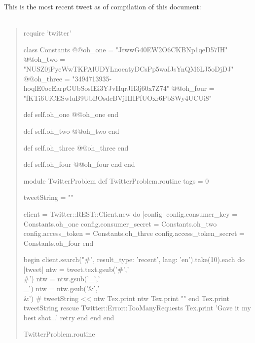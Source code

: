 \documentclass{article}
\begin{document}
This is the most recent tweet as of compilation of this document:\\\\
\begin{quote}
\begin{rbtex}
    require 'twitter'

    class Constants
    	@@oh_one = "JtwwG40EW2O6CKBNp1qeD57IH"
    	@@oh_two = "NUSZ0jPyeWwTKPAlUDYLnoeatyDCsPp5waIJsYnQM6LJ5oDjDJ"
    	@@oh_three = "3494713935-hoqlE0ocEarpGUbSosIEi3YJvHqrJH3j60x7Z74"
    	@@oh_four = "fKTi6UiCESwluB9UbBOsdcBVjHHPfUOxr6PbSWy4UCUi8"

    	def self.oh_one
    		@@oh_one
    	end

    	def self.oh_two
    		@@oh_two
    	end

    	def self.oh_three
    		@@oh_three
    	end

    	def self.oh_four
    		@@oh_four
    	end
    end

    module TwitterProblem
    	def TwitterProblem.routine
    		tags = 0

            tweetString = ""

    		client = Twitter::REST::Client.new do |config|
    		  config.consumer_key        = Constants.oh_one
    		  config.consumer_secret     = Constants.oh_two
    		  config.access_token        = Constants.oh_three
    		  config.access_token_secret = Constants.oh_four
    		end

    		begin
    			client.search("#", result_type: 'recent', lang: 'en').take(10).each do |tweet|
                    ntw = tweet.text.gsub('#','\\#')
                    ntw = ntw.gsub('_','\\_')
                    ntw = ntw.gsub('&','\\&')
                    # tweetString << ntw
                    Tex.print ntw
                    Tex.print ""
                end
                Tex.print tweetString
    		rescue Twitter::Error::TooManyRequests
                Tex.print 'Gave it my best shot...'
    			retry
    		end
    	end
    end

    TwitterProblem.routine
\end{rbtex}
\end{quote}
\end{document}

